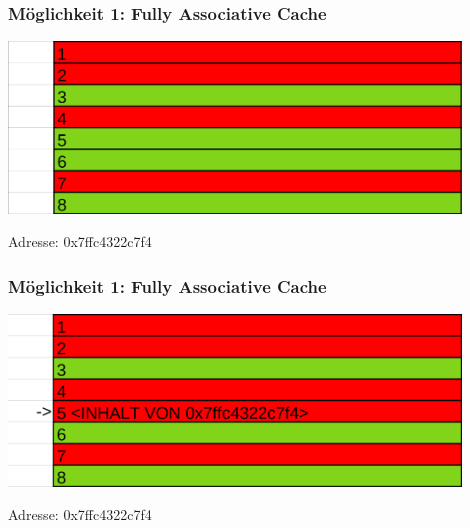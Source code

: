 \documentclass{beamer}
\begin{document}
%
%
\begin{frame}
\frametitle{M\"oglichkeit 1: Fully Associative Cache}
\centerline{\includegraphics[width=12cm]{fac1.png}}
Adresse: 0x7ffc4322c7f4
\end{frame}


\begin{frame}
\frametitle{M\"oglichkeit 1: Fully Associative Cache}
\centerline{\includegraphics[width=12cm]{fac2.png}}
Adresse: 0x7ffc4322c7f4
\end{frame}
\end{document}
